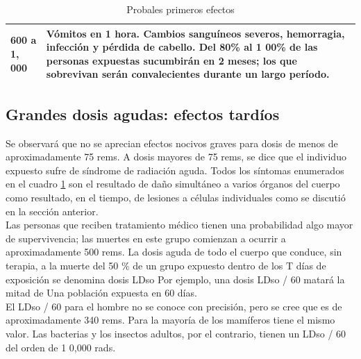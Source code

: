 \documentclass[]{article}
\begin{document}
\begin{table}[h!]
\begin{tabular}{||m{3cm}|m{30em}||}
		600 a 1, 000                                                                 & Vómitos en 1 hora. Cambios sanguíneos severos, hemorragia, infección y pérdida de cabello. Del 80\% al 1 00\% de las personas expuestas sucumbirán en 2 meses; los que sobrevivan serán convalecientes durante un largo período.                                                                                                                                                                                                                                    \\ \hline
	\end{tabular}
\caption{Probales primeros efectos}
\label{cuad:probaPrimEF}
\end{table}

\subsection{Grandes dosis agudas: efectos tardíos}

Se observará que no se aprecian efectos nocivos graves para dosis de menos de aproximadamente 75 rems. A dosis mayores de 75 rems, se dice que el individuo expuesto sufre de síndrome de radiación aguda.
 Todos los síntomas enumerados en el cuadro \ref{cuad:probaPrimEF} son el resultado de daño simultáneo a varios órganos del cuerpo como resultado, en el tiempo, de lesiones a células individuales como se discutió en la sección anterior.\\


Las personas que reciben tratamiento médico tienen una probabilidad algo mayor de supervivencia; las muertes en este grupo comienzan a ocurrir a aproximadamente 500 rems. La dosis aguda de todo el cuerpo que conduce, sin terapia, a la muerte del 50 $\%$ de un grupo expuesto dentro de los T días de exposición se denomina dosis LDso Por ejemplo, una dosis LDso / 60 matará la mitad de Una población expuesta en 60 días.\\

El LDso / 60 para el hombre no se conoce con precisión, pero se cree que es de aproximadamente 340 rems. Para la mayoría de los mamíferos tiene el mismo valor. Las bacterias y los insectos adultos, por el contrario, tienen un LDso / 60 del orden de 1 0,000 rads.\\
\end{document}
